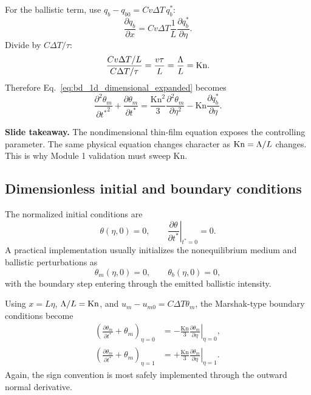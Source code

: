 \documentclass[11pt]{article}
\begin{document}
For the ballistic term, use \(q_b-q_{b0}=C v\Delta T\,q_b^*\):
\begin{equation}
    \frac{\partial q_b}{\partial x}
    =C v\Delta T\frac{1}{L}\frac{\partial q_b^*}{\partial\eta}.
\end{equation}
Divide by \(C\Delta T/\tau\):
\begin{equation}
    \frac{C v\Delta T/L}{C\Delta T/\tau}
    =\frac{v\tau}{L}=\frac{\Lambda}{L}=\mathrm{Kn}.
\end{equation}
Therefore Eq.~\eqref{eq:bd_1d_dimensional_expanded} becomes
\begin{equation}
    \boxed{
    \frac{\partial^2\theta_m}{\partial {t^*}^2}
    +\frac{\partial\theta_m}{\partial t^*}
    =\frac{\mathrm{Kn}^2}{3}\frac{\partial^2\theta_m}{\partial\eta^2}
    -\mathrm{Kn}\frac{\partial q_b^*}{\partial\eta}.}
    \label{eq:bd_1d_dimensionless_expanded}
\end{equation}

\begin{notebox}
\textbf{Slide takeaway.} The nondimensional thin-film equation exposes the controlling parameter. The same physical equation changes character as \(\mathrm{Kn}=\Lambda/L\) changes. This is why Module 1 validation must sweep \(\mathrm{Kn}\).
\end{notebox}

\subsection{Dimensionless initial and boundary conditions}
The normalized initial conditions are
\begin{equation}
    \theta(\eta,0)=0,
    \qquad
    \left.\frac{\partial\theta}{\partial t^*}\right|_{t^*=0}=0.
\end{equation}
A practical implementation usually initializes the nonequilibrium medium and ballistic perturbations as
\begin{equation}
    \theta_m(\eta,0)=0,
    \qquad
    \theta_b(\eta,0)=0,
\end{equation}
with the boundary step entering through the emitted ballistic intensity.

Using \(x=L\eta\), \(\Lambda/L=\mathrm{Kn}\), and \(u_m-u_{m0}=C\Delta T\theta_m\), the Marshak-type boundary conditions become
\begin{align}
    \left(\frac{\partial\theta_m}{\partial t^*}+\theta_m\right)_{\eta=0}
    &= -\frac{\mathrm{Kn}}{3}
    \left.\frac{\partial\theta_m}{\partial\eta}\right|_{\eta=0},\label{eq:left_bc_nd}\\
    \left(\frac{\partial\theta_m}{\partial t^*}+\theta_m\right)_{\eta=1}
    &= +\frac{\mathrm{Kn}}{3}
    \left.\frac{\partial\theta_m}{\partial\eta}\right|_{\eta=1}.\label{eq:right_bc_nd}
\end{align}
Again, the sign convention is most safely implemented through the outward normal derivative.
\end{document}
